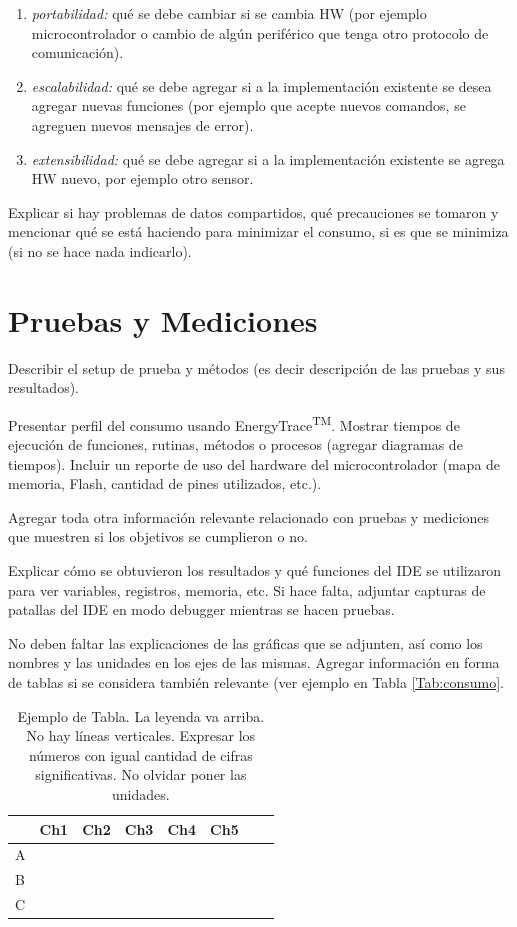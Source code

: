 \documentclass[a4paper,12pt]{article}
\begin{document}
\begin{linenumbers}
\begin{enumerate}
 \item \textit{portabilidad:} qué se debe cambiar si se cambia HW (por ejemplo microcontrolador o cambio de alg\'un periférico que tenga otro protocolo de comunicaci\'on).
 \item \textit{escalabilidad:} qué se debe agregar si a la implementaci\'on existente se desea agregar nuevas funciones (por ejemplo que acepte
 nuevos comandos, se agreguen nuevos mensajes de error).
 \item \textit{extensibilidad:} qué se debe agregar si a la implementaci\'on existente se agrega HW nuevo, por ejemplo otro sensor.
\end{enumerate}

Explicar si hay problemas de datos compartidos, qué precauciones se tomaron y mencionar qué se está haciendo para minimizar el consumo, si es que se minimiza (si no se hace nada indicarlo).


\section{Pruebas y Mediciones}
\label{sec:pruebas}

Describir el setup de prueba y m\'etodos (es decir descripci\'on de las pruebas y sus resultados). 

Presentar perfil del consumo usando EnergyTrace\textsuperscript{TM}. Mostrar tiempos de ejecución de funciones, rutinas, m\'etodos o procesos (agregar diagramas de tiempos). Incluir un reporte de uso del hardware del microcontrolador (mapa de memoria, Flash, cantidad de pines utilizados, etc.).

Agregar toda otra informaci\'on relevante relacionado con pruebas y mediciones que muestren si los objetivos se cumplieron o no.

Explicar cómo se obtuvieron los resultados y qué funciones del IDE se utilizaron para ver variables, registros, memoria, etc. Si hace falta, adjuntar capturas de patallas del IDE en modo debugger mientras se hacen pruebas.

No deben faltar las explicaciones de las gr\'aficas que se adjunten, as\'i como los nombres y las unidades en los ejes de las mismas. Agregar informaci\'on en forma de tablas si se considera tambi\'en relevante (ver ejemplo en Tabla \ref{Tab:consumo}.

 \begin{table}[ht]
 	\centering
 	 		\caption{Ejemplo de Tabla. La leyenda va arriba. No hay líneas verticales. Expresar los números con igual cantidad de cifras significativas. No olvidar poner las unidades.}
 	\begin{tabular}{lccccccc}
 		\hline \hline
 		 			& Ch1	& Ch2   & Ch3   & Ch4   & Ch5   & 	   \\ \hline 
 	   A   		&			& 			  & 		  & 		  & 			 & 	  \\ \hline
 	   B        	&			& 			   & 		   & 		   & 			  &    \\ \hline
 	   C      		&			& 			  & 		  & 	 	 & 			   &    \\


\end{tabular}
\end{table}
\end{linenumbers}
\end{document}
